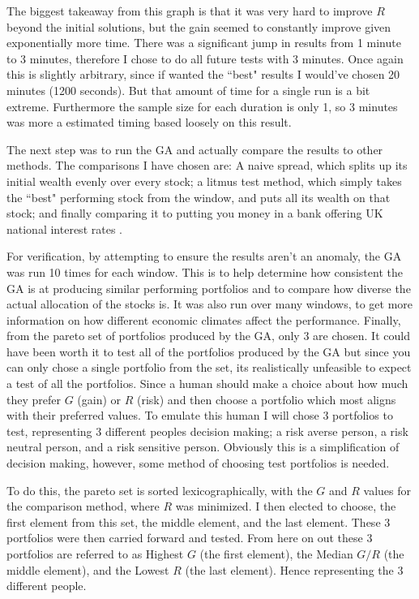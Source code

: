\documentclass[11pt]{article}
\begin{document}
    The biggest takeaway from this graph is that it was very hard to improve \(R\) beyond
    the initial solutions, but the gain seemed to constantly improve given exponentially
    more time. There was a significant jump in results from 1 minute to 3 minutes,
    therefore I chose to do all future tests with 3 minutes. Once again this is slightly
    arbitrary, since if wanted the ``best" results I would've chosen 20 minutes (1200 seconds).
    But that amount of time for a single run is a bit extreme. Furthermore the sample size for
    each duration is only 1, so 3 minutes was more a estimated timing based loosely
    on this result.

    The next step was to run the GA and actually compare the results to other methods.
    The comparisons I have chosen are: A naive spread, which splits up its initial wealth
    evenly over every stock; a litmus test method, which simply takes the ``best" performing
    stock from the window, and puts all its wealth on that stock; and finally
    comparing it to putting you money in a bank offering UK national interest rates
    \cite{BankOfE}.

    For verification, by attempting to ensure the results aren't an anomaly, the GA was run 10
    times for each window. This is to help determine how consistent the GA is at producing
    similar performing portfolios and to compare how diverse the actual allocation
    of the stocks is. It was also run over many windows, to get more information
    on how different economic climates affect the performance. Finally, from the pareto
    set of portfolios produced by the GA, only 3 are chosen. It could have been worth
    it to test all of the portfolios produced by the GA but since you can only
    chose a single portfolio from the set, its realistically unfeasible to expect a
    test of all the portfolios. Since a human should make a choice about how much
    they prefer \(G\) (gain) or \(R\) (risk) and then choose a portfolio which most
    aligns with their preferred values. To emulate this human I will chose 3
    portfolios to test, representing 3 different peoples decision making; a risk
    averse person, a risk neutral person, and a risk sensitive person. Obviously
    this is a simplification of decision making, however, some method of choosing
    test portfolios is needed.

    To do this, the pareto set is sorted lexicographically, with the \(G\) and \(R\)
    values for the comparison method, where \(R\) was minimized. I then elected to choose,
    the first element from this set, the middle element, and the last element.
    These 3 portfolios were then carried forward and tested. From here on out
    these 3 portfolios are referred to as Highest \(G\) (the first element),
    the Median \(G/R\) (the middle element), and the Lowest \(R\) (the last element).
    Hence representing the 3 different people.
\end{document}
